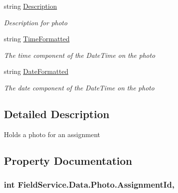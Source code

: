 \begin{DoxyCompactItemize}
string \hyperlink{class_field_service_1_1_data_1_1_photo_ab6f347068da6747beee125bd1e47c9aa}{Description}
\begin{DoxyCompactList}\small\item\em Description for photo \end{DoxyCompactList}\item 
string \hyperlink{class_field_service_1_1_data_1_1_photo_a338e84fca5f86bb0fdbb3962028cd960}{Time\+Formatted}
\begin{DoxyCompactList}\small\item\em The time component of the Date\+Time on the photo \end{DoxyCompactList}\item 
string \hyperlink{class_field_service_1_1_data_1_1_photo_a97cb9c2da7a4d61a65647fd14a9fa9c7}{Date\+Formatted}
\begin{DoxyCompactList}\small\item\em The date component of the Date\+Time on the photo \end{DoxyCompactList}\end{DoxyCompactItemize}


\subsection{Detailed Description}
Holds a photo for an assignment 



\subsection{Property Documentation}
\hypertarget{class_field_service_1_1_data_1_1_photo_aad1924d5c631bd0f7ad25e3f2625c806}{
\subsubsection[{Assignment\+Id}]{\setlength{\rightskip}{0pt plus 5cm}int Field\+Service.\+Data.\+Photo.\+Assignment\+Id\hspace{0.3cm}{\ttfamily [get]}, {\ttfamily [set]}}}\label{class_field_service_1_1_data_1_1_photo_aad1924d5c631bd0f7ad25e3f2625c806}


